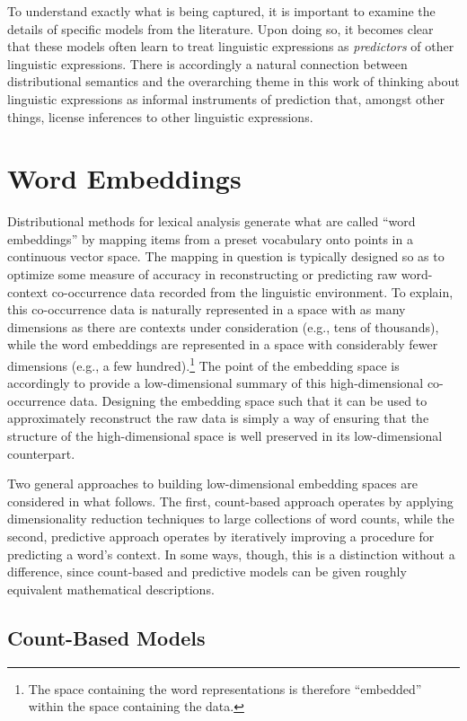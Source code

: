 To understand exactly what is being captured, it is important to examine the details of specific models from the literature. Upon doing so, it becomes clear that these models often learn to treat linguistic expressions as \textit{predictors} of other linguistic expressions. There is accordingly a natural connection between distributional semantics and the overarching theme in this work of thinking about linguistic expressions as informal instruments of prediction that, amongst other things, license inferences to other linguistic expressions.

\section{Word Embeddings}

Distributional methods for lexical analysis generate what are called ``word embeddings'' by mapping items from a preset vocabulary onto points in a continuous vector space. The mapping in question is typically designed so as to optimize some measure of accuracy in reconstructing or predicting raw word-context co-occurrence data recorded from the linguistic environment. To explain, this co-occurrence data is naturally represented in a space with as many dimensions as there are contexts under consideration (e.g., tens of thousands), while the word embeddings are represented in a space with considerably fewer dimensions (e.g., a few hundred).\footnote{The space containing the word representations is therefore ``embedded'' within the space containing the data.} The point of the embedding space is accordingly to provide a low-dimensional summary of this high-dimensional co-occurrence data. Designing the embedding space such that it can be used to approximately reconstruct the raw data is simply a way of ensuring that the structure of the high-dimensional space is well preserved in its low-dimensional counterpart. 

Two general approaches to building low-dimensional embedding spaces are considered in what follows. The first, count-based approach operates by applying dimensionality reduction techniques to large collections of word counts, while the second, predictive approach operates by iteratively improving a procedure for predicting a word's context. In some ways, though, this is a distinction without a difference, since count-based and predictive models can be given roughly equivalent mathematical descriptions. 

\subsection{Count-Based Models}

